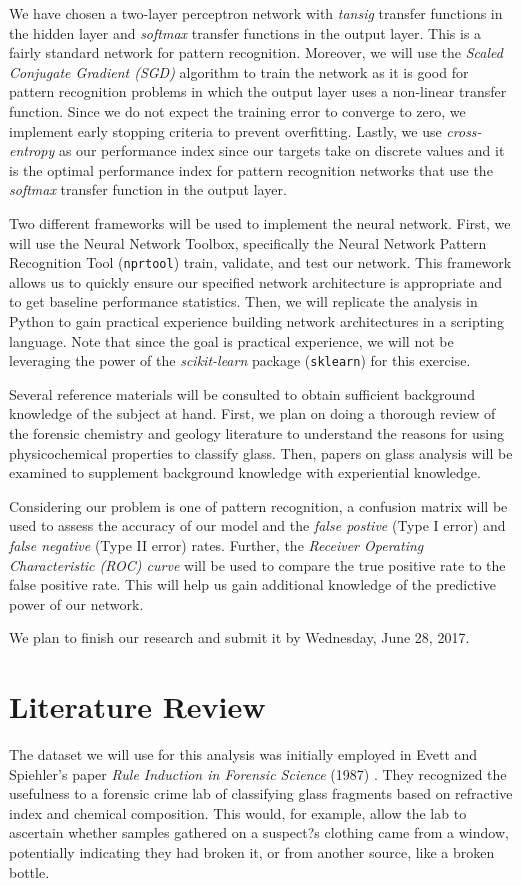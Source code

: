 \documentclass[12pt,halfline,a4paper]{ouparticle}
\begin{document}
We have chosen a two-layer perceptron network with \emph{tansig} transfer functions in the hidden layer and \emph{softmax} transfer functions in the output layer. This is a fairly standard network for pattern recognition. Moreover, we will use the \emph{Scaled Conjugate Gradient (SGD)} algorithm to train the network as it is good for pattern recognition problems in which the output layer uses a non-linear transfer function. Since we do not expect the training error to converge to zero, we implement early stopping criteria to prevent overfitting. Lastly, we use \emph{cross-entropy} as our performance index since our targets take on discrete values and it is the optimal performance index for pattern recognition networks that use the \emph{softmax} transfer function in the output layer. 

Two different frameworks will be used to implement the neural network. First, we will use the Neural Network Toolbox, specifically the Neural Network Pattern Recognition Tool (\verb|nprtool|) train, validate, and test our network. This framework allows us to quickly ensure our specified network architecture is appropriate and to get baseline performance statistics. Then, we will replicate the analysis in Python to gain practical experience building network architectures in a scripting language. Note that since the goal is practical experience, we will not be leveraging the power of the \emph{scikit-learn} package (\verb|sklearn|) for this exercise. 

Several reference materials will be consulted to obtain sufficient background knowledge of the subject at hand. First, we plan on doing a thorough review of the forensic chemistry and geology literature to understand the reasons for using physicochemical properties to classify glass. Then, papers on glass analysis will be examined to supplement background knowledge with experiential knowledge. 

Considering our problem is one of pattern recognition, a confusion matrix will be used to assess the accuracy of our model and the \emph{false postive} (Type I error) and \emph{false negative} (Type II error) rates. Further, the \emph{Receiver Operating Characteristic (ROC) curve} will be used to compare the true positive rate to the false positive rate. This will help us gain additional knowledge of the predictive power of our network. 

We plan to finish our research and submit it by Wednesday, June 28, 2017. 

\section{Literature Review}
\label{sec2}
The dataset we will use for this analysis was initially employed in Evett and Spiehler's paper \emph{Rule Induction in Forensic Science} (1987) \cite{evett1987}. They recognized the usefulness to a forensic crime lab of classifying glass fragments based on refractive index and chemical composition. This would, for example, allow the lab to ascertain whether samples gathered on a suspect?s clothing came from a window, potentially indicating they had broken it, or from another source, like a broken bottle. 
\end{document}
